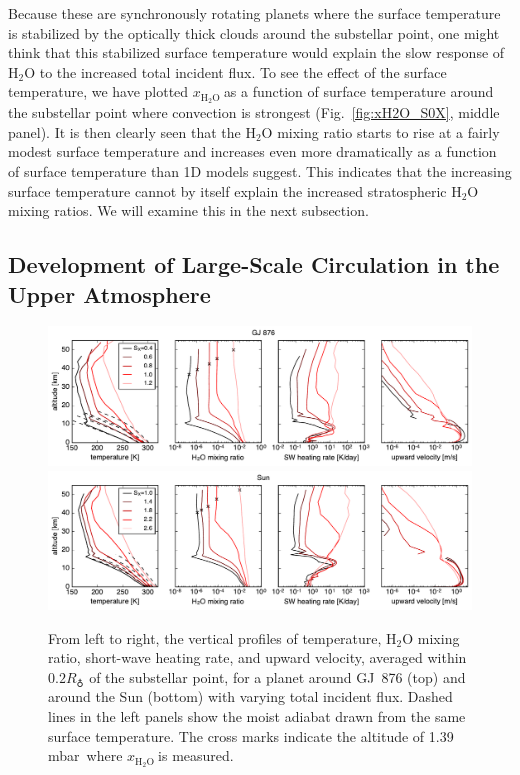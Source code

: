 \documentclass[11pt,numberedappendix,twocolappendix,]{emulateapj}
\def\water{H$_2$O }
\def\xwater{\dsa{$x_\text{\water}$}}
\def\preslevel{1.39 mbar\ }
\newcommand{\dsa}[1]{{\color{blue}#1}}
\begin{document}
Because these are synchronously rotating planets where the surface temperature is stabilized by the optically thick clouds around the substellar point, one might think that this stabilized surface temperature would explain the slow  response of \water to the increased total incident flux. 
To see the effect of the surface temperature, we have plotted \xwater as a function of surface temperature around the substellar point where convection is strongest (Fig.~\ref{fig:xH2O_S0X}, middle panel). 
It is then clearly seen that the \water mixing ratio starts to rise at a fairly modest surface temperature and increases even more dramatically as a function of surface temperature than 1D models suggest. 
This indicates that the increasing surface temperature cannot by itself explain the increased stratospheric \water mixing ratios. 
We will examine this in the next subsection. 

\subsection{Development of Large-Scale Circulation in the Upper Atmosphere}
\label{ss:result_omega}


\begin{figure}[htb]
    \begin{center}
    \includegraphics[width=1\hsize]{fig/AqOH0TLS_GJ876_temp_xH2O_vz_heat.pdf}
    \includegraphics[width=1\hsize]{fig/AqOH0TLS_Sun_temp_xH2O_vz_heat.pdf}
    \end{center}
\caption{From left to right, the vertical profiles of temperature, \water mixing ratio, short-wave heating rate, and upward velocity, averaged within $0.2R_\earth$ of the substellar point, for a planet around GJ~876 (top) and around the Sun (bottom) with varying total incident flux. Dashed lines in the left panels show the moist adiabat drawn from the same surface temperature. The cross marks indicate the altitude of \preslevel where \xwater is measured. }
\label{fig:AqOH0TLS_GJ876_temp_xH2O_vz_heat}
\end{figure}
\end{document}
